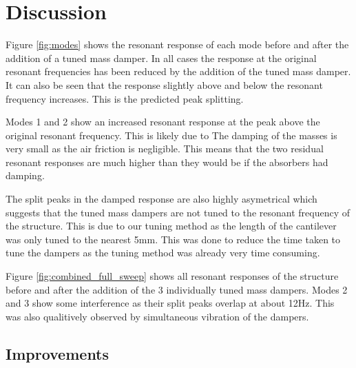 \documentclass[8pt]{article}
\begin{document}
\vspace{-24pt}
\section{Discussion}
\vspace{-16pt}



Figure \ref{fig:modes} shows the resonant response of each mode before and after the addition of a tuned mass damper.
In all cases the response at the original resonant frequencies has been reduced by the addition of the tuned mass damper. It can also be seen that the
response slightly above and below the resonant frequency increases. This is the predicted peak splitting.

\vspace{-8pt}

Modes 1 and 2 show an increased resonant response at the peak above the original resonant frequency.
This is likely due to The damping of the masses is very small as the air friction is negligible. 
This means that the two residual resonant responses are much higher than they would be if the absorbers had damping.

\vspace{-8pt}

The split peaks in the damped response are also highly asymetrical which suggests that the tuned mass dampers are not tuned to the resonant frequency of the structure.
This is due to our tuning method as the length of the cantilever was only tuned to the nearest 5mm.
This was done to reduce the time taken to tune the dampers as the tuning method was already very time consuming.

\vspace{-8pt}

Figure \ref{fig:combined_full_sweep} shows all resonant responses of the structure before and after the addition of the 3 individually tuned mass dampers.
Modes 2 and 3 show some interference as their split peaks overlap at about 12Hz. This was also qualitively observed by simultaneous vibration of the dampers.

\vspace{-20pt}

\subsection{Improvements}

\vspace{-16pt}
\end{document}
